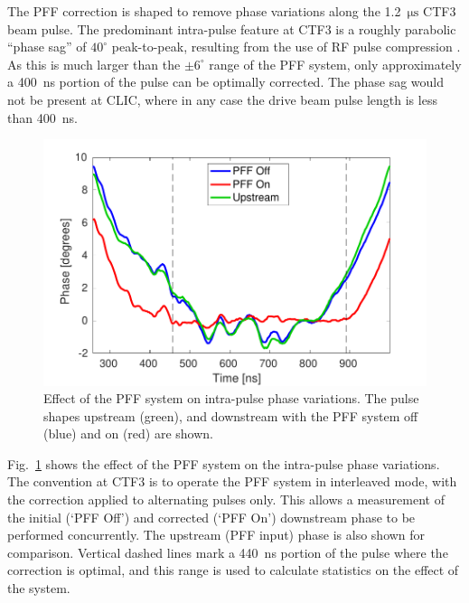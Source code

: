 \documentclass[%
 reprint,
 superscriptaddress,
 amsmath,
 amssymb,
 prl,
]{revtex4-1}
\begin{document}
The PFF correction is shaped to remove phase variations along the 
1.2~\(\mathrm{\mu s}\) CTF3 beam pulse. The predominant intra-pulse feature at 
CTF3 is a roughly parabolic ``phase sag'' of \(40^\circ\) peak-to-peak, 
resulting from the use of RF pulse compression \cite{CLICCDR}. As this is much 
larger than the \(\pm 6^\circ\) range of the PFF system, only approximately a 
400~ns portion of the pulse can be optimally corrected. The phase sag would not 
be present at CLIC, where in any case the drive beam pulse length is less than 
400~ns.

\begin{figure}
	\includegraphics[width=\columnwidth]{figs/shape}
	\caption{\label{fig:shape}Effect of the PFF system on intra-pulse phase 
		variations. The pulse shapes upstream (green), and downstream with the 
		PFF 
		system off (blue) and on (red) are shown.}
\end{figure}

Fig.~\ref{fig:shape} shows the effect of the PFF system on the intra-pulse 
phase variations. The convention at CTF3 is to 
operate the PFF system in interleaved mode, with 
the correction applied to alternating pulses only. This allows a measurement of 
the initial (`PFF Off') and corrected (`PFF On') downstream phase to be 
performed concurrently. The upstream (PFF input) phase is also shown for 
comparison. Vertical dashed lines mark a 440~ns portion of the pulse where the 
correction is optimal, and this range is used to calculate statistics on the 
effect of the system. 
\end{document}

